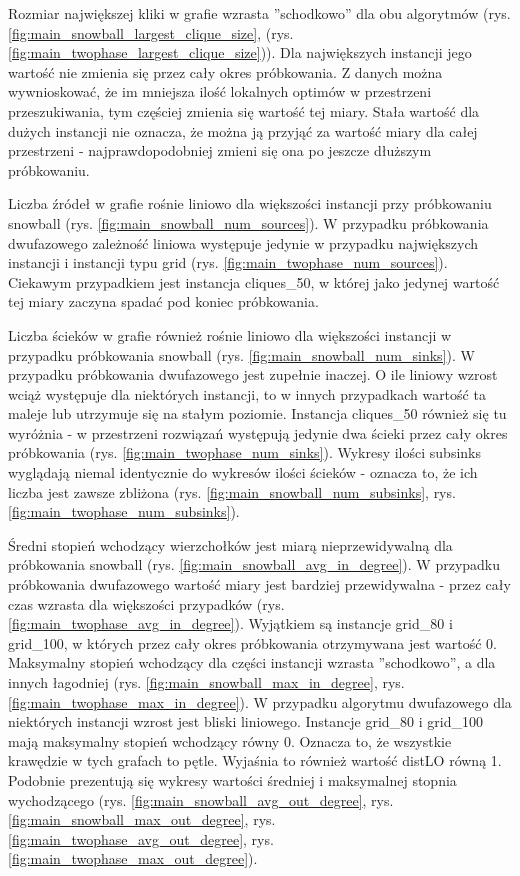 Rozmiar największej kliki w grafie wzrasta ''schodkowo'' dla obu algorytmów (rys. \ref{fig:main_snowball_largest_clique_size}, (rys. \ref{fig:main_twophase_largest_clique_size})).
Dla największych instancji jego wartość nie zmienia się przez cały okres próbkowania.
Z danych można wywnioskować, że im mniejsza ilość lokalnych optimów w przestrzeni przeszukiwania, tym częściej zmienia się wartość tej miary.
Stała wartość dla dużych instancji nie oznacza, że można ją przyjąć za wartość miary dla całej przestrzeni - najprawdopodobniej zmieni się
ona po jeszcze dłuższym próbkowaniu.

Liczba źródeł w grafie rośnie liniowo dla większości instancji przy próbkowaniu snowball (rys. \ref{fig:main_snowball_num_sources}).
W przypadku próbkowania dwufazowego zależność liniowa występuje jedynie w przypadku największych instancji i instancji typu grid (rys. \ref{fig:main_twophase_num_sources}).
Ciekawym przypadkiem jest instancja cliques\_50, w której jako jedynej wartość tej miary zaczyna spadać pod koniec próbkowania.

Liczba ścieków w grafie również rośnie liniowo dla większości instancji w przypadku próbkowania snowball (rys. \ref{fig:main_snowball_num_sinks}).
W przypadku próbkowania dwufazowego jest zupełnie inaczej. O ile liniowy wzrost wciąż występuje dla niektórych instancji, to w innych przypadkach
wartość ta maleje lub utrzymuje się na stałym poziomie. Instancja cliques\_50 również się tu wyróżnia - w przestrzeni rozwiązań występują jedynie dwa ścieki
przez cały okres próbkowania (rys. \ref{fig:main_twophase_num_sinks}).
Wykresy ilości subsinks wyglądają niemal identycznie do wykresów ilości ścieków - oznacza to, że ich liczba jest zawsze zbliżona
(rys. \ref{fig:main_snowball_num_subsinks}, rys. \ref{fig:main_twophase_num_subsinks}).

Średni stopień wchodzący wierzchołków jest miarą nieprzewidywalną dla próbkowania snowball (rys. \ref{fig:main_snowball_avg_in_degree}).
W przypadku próbkowania dwufazowego wartość miary jest bardziej przewidywalna - przez cały czas wzrasta dla większości przypadków (rys. \ref{fig:main_twophase_avg_in_degree}).
Wyjątkiem są instancje grid\_80 i grid\_100, w których przez cały okres próbkowania otrzymywana jest wartość 0.
Maksymalny stopień wchodzący dla części instancji wzrasta ''schodkowo'', a dla innych łagodniej (rys. \ref{fig:main_snowball_max_in_degree}, rys. \ref{fig:main_twophase_max_in_degree}).
W przypadku algorytmu dwufazowego dla niektórych instancji wzrost jest bliski liniowego.
Instancje grid\_80 i grid\_100 mają maksymalny stopień wchodzący równy 0.
Oznacza to, że wszystkie krawędzie w tych grafach to pętle. Wyjaśnia to również wartość distLO równą 1.
Podobnie prezentują się wykresy wartości średniej i maksymalnej stopnia wychodzącego
(rys. \ref{fig:main_snowball_avg_out_degree}, rys. \ref{fig:main_snowball_max_out_degree}, rys. \ref{fig:main_twophase_avg_out_degree}, rys. \ref{fig:main_twophase_max_out_degree}).

